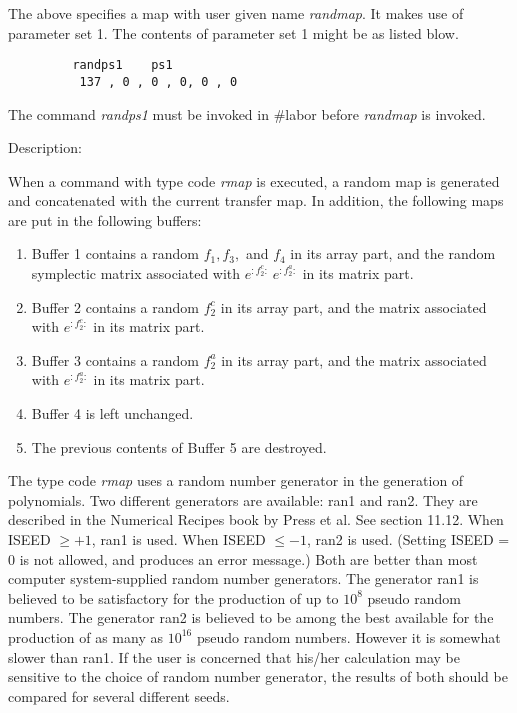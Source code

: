 \vspace{2mm}
The above specifies a map with user given name {\em randmap}.  It makes
use of parameter set 1.  The contents of parameter set 1 might be as listed blow.
\vspace{2mm}
\begin{verbatim}
         randps1    ps1
          137 , 0 , 0 , 0, 0 , 0
\end{verbatim}
\vspace{2mm}
The command {\em randps1} must be invoked in \#labor before {\em randmap}
is invoked.

\vspace{5mm}
     Description:
\vspace{2mm}

When a command with type code {\em rmap } is executed, a random map is generated and concatenated with the current transfer map.  In addition, the following maps
are put in the following buffers:

\begin{enumerate}
\item  Buffer 1 contains a random $f_1,f_3,$ and $f_4$ in its array part,
and the random symplectic matrix associated with $e^{:f_2^c:}\ e^{:f_2^a:}$ in its matrix part.

\item  Buffer 2 contains a random $f_2^c$ in its array part, and the
matrix associated with $e^{:f_2^c:}$ in its matrix part.

\item  Buffer 3 contains a random $f_2^a$ in its array part, and the
matrix associated with $e^{:f_2^a:}$ in its matrix part.

\item  Buffer 4 is left unchanged.

\item  The previous contents of Buffer 5 are destroyed.
\end{enumerate}

The type code {\em rmap} uses a random number generator in the generation
of polynomials.  Two different generators are available:  ran1
and ran2.  They are described in the Numerical Recipes book by Press et
al.  See section 11.12.  When ISEED $\geq +1$, ran1 is used.
When ISEED $\leq -1$, ran2 is used.  (Setting ISEED = 0 is not allowed,
and produces an error message.)  Both are better than most computer
system-supplied random number generators.  The generator ran1 is believed
to be satisfactory for the production of up to $10^8$ pseudo random numbers.  The generator ran2
is believed to be among the best available for the production of as many
as $ 10^{16}$ pseudo random numbers.  However it is somewhat slower than
ran1.  If the user is concerned that
his/her calculation may be sensitive to the choice of random number
generator, the results of both should be compared for several different
seeds.

